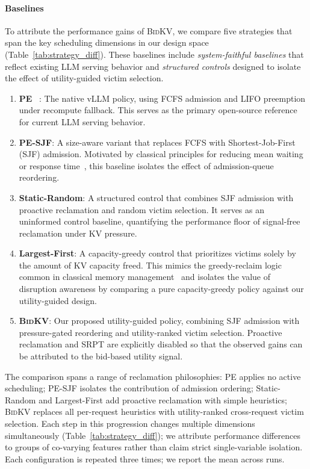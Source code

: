 \documentclass[conference]{IEEEtran}
\newcommand{\bidkv}{\textsc{BidKV}\xspace}
\begin{document}
\paragraph{Baselines}
To attribute the performance gains of \bidkv, we compare five strategies that span the key scheduling dimensions in our design space (Table~\ref{tab:strategy_diff}). These baselines include \emph{system-faithful baselines} that reflect existing LLM serving behavior and \emph{structured controls} designed to isolate the effect of utility-guided victim selection.

\begin{enumerate}
    \item \textbf{PE} ~\cite{Kwon2023}: The native vLLM policy, using FCFS admission and LIFO preemption under recompute fallback. This serves as the primary open-source reference for current LLM serving behavior.

    \item \textbf{PE-SJF}: A size-aware variant that replaces FCFS with Shortest-Job-First (SJF) admission. Motivated by classical principles for reducing mean waiting or response time~\cite{Bansal2001SRPT, Gu2020Tiresias}, this baseline isolates the effect of admission-queue reordering.

    \item \textbf{Static-Random}: A structured control that combines SJF admission with proactive reclamation and random victim selection. It serves as an uninformed control baseline, quantifying the performance floor of signal-free reclamation under KV pressure.

    \item \textbf{Largest-First}: A capacity-greedy control that prioritizes victims solely by the amount of KV capacity freed. This mimics the greedy-reclaim logic common in classical memory management~\cite{Silberschatz2018} and isolates the value of disruption awareness by comparing a pure capacity-greedy policy against our utility-guided design.

    \item \textbf{\bidkv}: Our proposed utility-guided policy, combining SJF admission with pressure-gated reordering and utility-ranked victim selection. Proactive reclamation and SRPT are explicitly disabled so that the observed gains can be attributed to the bid-based utility signal.
\end{enumerate}

The comparison spans a range of reclamation philosophies: PE applies no
active scheduling; PE-SJF isolates the contribution of admission ordering;
Static-Random and Largest-First add proactive reclamation with simple
heuristics; \bidkv replaces all per-request heuristics with utility-ranked
cross-request victim selection.  Each step in this progression changes multiple
dimensions simultaneously (Table~\ref{tab:strategy_diff}); we attribute
performance differences to groups of co-varying features rather than claim
strict single-variable isolation.  Each configuration is repeated three
times; we report the mean across runs.
\end{document}
